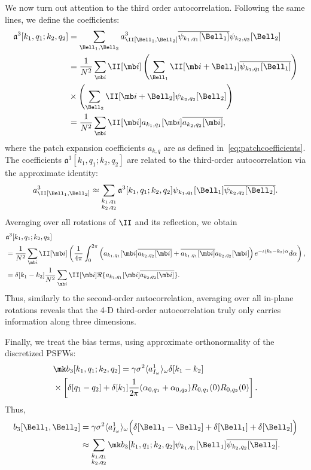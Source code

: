 \documentclass[9pt,twocolumn,twoside,lineno]{pnas-new}
\begin{document}
We now turn out attention to the third order autocorrelation. Following the same lines, we define the coefficients:
\[\begin{aligned} \mathfrak{a}^3[k_1,q_1;k_2,q_2] &= \sum_{\Bell_1, \Bell_2} a^3_\II[\Bell_1,\Bell_2]\overline{\psi_{k_1,q_1}[\Bell_1]}\psi_{k_2,q_2}[\Bell_2]\\
&= \frac{1}{N^2}\sum_{\mb i}\II[\mb i]\left(\sum_{\Bell_1}\II[\mb i+\Bell_1]\overline{\psi_{k_1,q_1}[\Bell_1]}\right)\\&\times \left(\sum_{\Bell_2}\II[\mb i+\Bell_2]\psi_{k_2,q_2}[\Bell_2]\right)\\
&= \frac{1}{N^2}\sum_{\mb i}\II[\mb i] a_{k_1,q_1}[\mb i]\overline{a_{k_2,q_2}[\mb i]},
\end{aligned}\]
where the patch expansion coefficients $a_{k,q}$ are as defined in~\eqref{eq:patchcoefficients}.
The coefficients $\mathfrak{a}^3[k_1,q_1;k_2,q_2]$ are related to the third-order autocorrelation via the approximate identity:
\[ a^3_\II[\Bell_1, \Bell_2] \approx \sum_{\substack{k_1,q_1\\ k_2,q_2}}\mathfrak{a}^3[k_1,q_1;k_2,q_2]\psi_{k_1,q_1}[\Bell_1]\overline{\psi_{k_2,q_2}[\Bell_2]}.\]
Averaging over all rotations of $\II$ and its reflection, we obtain
\begin{align} \label{eq:third_order_ac_pswf}
&\mathfrak{a}^3[k_1,q_1;k_2,q_2] \\&= \frac{1}{N^2}\sum_{\mb i}\II[\mb i]\left(\frac{1}{4\pi}\int_0^{2\pi}\left(a_{k_1,q_1}[\mb i]\overline{a_{k_2,q_2}[\mb i]} + \overline{a_{k_1,q_1}[\mb i]}a_{k_2,q_2}[\mb i]\right)e^{-\iota(k_1-k_2)\alpha}d\alpha\right), \nonumber\\
&= \delta[k_1 - k_2]\frac{1}{N^2}\sum_{\mb i}\II[\mb i]\Re\{a_{k_1,q_1}[\mb i]\overline{a_{k_2,q_2}[\mb i]}\}. 
\end{align}
Thus, similarly to the second-order autocorrelation, averaging over all in-plane rotations reveals that the 4-D third-order autocorrelation truly only carries information along three dimensions.

Finally, we treat the bias terms, using approximate orthonormality \TODO{!} of the discretized PSFWs:
\begin{align*}
&\mk b_3[k_1,q_1; k_2,q_2] = \gamma\sigma^2\langle a^1_{I_{\omega}} \rangle_\omega \delta[k_1 - k_2]\\&\times \left[\delta[q_1-q_2] + \delta[k_1]\frac{1}{2\pi}(\alpha_{0,q_1} + \alpha_{0,q_2})R_{0,q_1}(0)R_{0,q_2}(0)\right].
\end{align*}
%
Thus,
\begin{align*}
b_3[\Bell_1, \Bell_2] & = \gamma\sigma^2\langle a^1_{I_{\omega}}\rangle_{\omega}\Big(\delta[\Bell_1 - \Bell_2] +
\delta[\Bell_1] + \delta[\Bell_2]\Big) \\
& \approx \sum_{\substack{k_1, q_1\\ k_2, q_2}} \mk 
b_3[k_1,q_1; k_2, q_2]\psi_{k_1,q_1}[\Bell_1]\overline{\psi_{k_2,q_2}[\Bell_2]}.
\end{align*}
\end{document}
